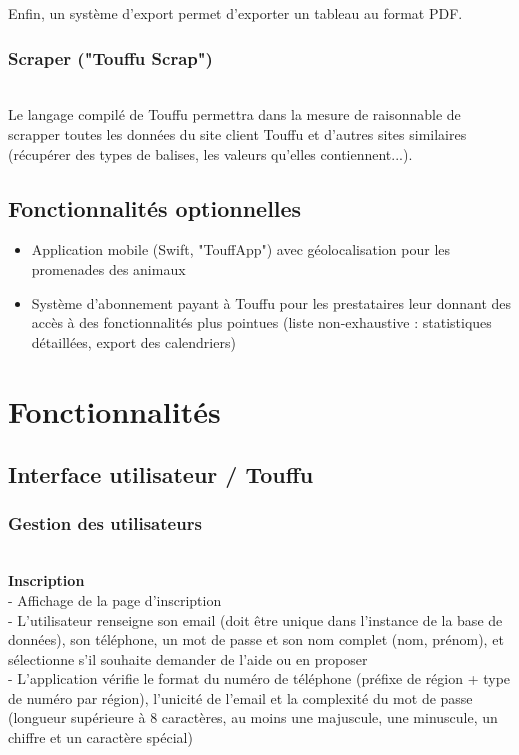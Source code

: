 \documentclass[conference]{IEEEtran}
\begin{document}
Enfin, un système d'export permet d'exporter un tableau au format PDF.\\

\subsubsection{Scraper ("Touffu Scrap")}\hfill\\

Le langage compilé de Touffu permettra dans la mesure de raisonnable de scrapper toutes les données du site client Touffu et d'autres sites similaires (récupérer des types de balises, les valeurs qu'elles contiennent...).

\subsection{Fonctionnalités optionnelles}
\begin{itemize}
	\item Application mobile (Swift, "TouffApp") avec géolocalisation pour les promenades des animaux
	\item Système d'abonnement payant à Touffu pour les prestataires leur donnant des accès à des fonctionnalités plus pointues (liste non-exhaustive : statistiques détaillées, export des calendriers)
\end{itemize}


\section{Fonctionnalités}

\subsection{Interface utilisateur / Touffu}

\subsubsection{Gestion des utilisateurs}\hfil\\

\textbf{Inscription}\\
- Affichage de la page d'inscription\\
- L'utilisateur renseigne son email (doit être unique dans l'instance de la base de données), son téléphone, un mot de passe et son nom complet (nom, prénom), et sélectionne s'il souhaite demander de l'aide ou en proposer\\
- L'application vérifie le format du numéro de téléphone (préfixe de région + type de numéro par région), l'unicité de l'email et la complexité du mot de passe (longueur supérieure à 8 caractères, au moins une majuscule, une minuscule, un chiffre et un caractère spécial)\\
\end{document}
